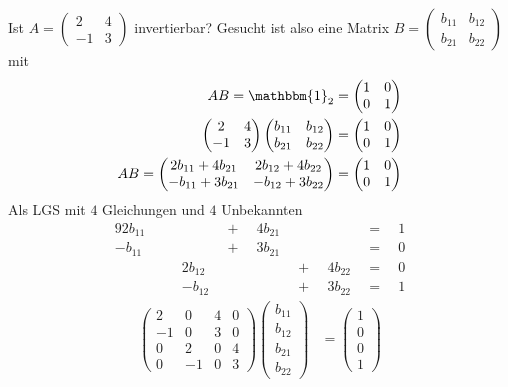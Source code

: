 Ist $A = \begin{pmatrix}2&4\\-1&3\end{pmatrix}$ invertierbar? Gesucht ist also eine Matrix $B = \begin{pmatrix}b_{11}&b_{12}\\b_{21}&b_{22}\end{pmatrix}$ mit
\begin{align*}
	AB = \mathbbm{1}_2 &= \begin{pmatrix}1&0\\0&1\end{pmatrix} \\
	\begin{pmatrix}2&4\\-1&3\end{pmatrix}\begin{pmatrix}b_{11}&b_{12}\\b_{21}&b_{22}\end{pmatrix} &= \begin{pmatrix}1&0\\0&1\end{pmatrix} \\
	AB = \begin{pmatrix}2b_{11}+4b_{21}&2b_{12}+4b_{22}\\-b_{11}+3b_{21}&-b_{12}+3b_{22}\end{pmatrix} &= \begin{pmatrix}1&0\\0&1\end{pmatrix}
\end{align*}
Als LGS mit $4$ Gleichungen und $4$ Unbekannten
\begin{alignat*}{9}
2b_{11} & \enspace\enspace & & \enspace+\enspace & 4b_{21} & & & \enspace=\enspace & 1 \\
-b_{11} & & & \enspace+\enspace & 3b_{21} & & & \enspace=\enspace & 0 \\
 & \enspace\enspace & 2b_{12} & & & \enspace+\enspace & 4b_{22} & \enspace=\enspace & 0 \\
 & \enspace\enspace & -b_{12} & & & \enspace+\enspace & 3b_{22} & \enspace=\enspace & 1
\end{alignat*}
\begin{align*}
	\begin{pmatrix}
		2 & 0 & 4 & 0 \\
		-1 & 0 & 3 & 0 \\
		0 & 2 & 0 & 4 \\
		0 & -1 & 0 & 3
	\end{pmatrix} \begin{pmatrix}
		b_{11} \\
		b_{12} \\
		b_{21} \\
		b_{22}
	\end{pmatrix} &= \begin{pmatrix}
		1 \\
		0 \\
		0 \\
		1
	\end{pmatrix}
\end{align*}

